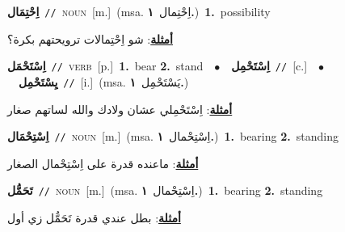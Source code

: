 \documentclass[10pt,a4paper,twoside]{article} %
\begin{document}
\begin{multicols}{2}
{\setlength\topsep{0pt}\textbf{\foreignlanguage{arabic}{اِحْتِمَال}}\ {\color{gray}\texttt{//}\color{black}}\ \textsc{noun}\ [m.]\ \color{gray}(msa. \foreignlanguage{arabic}{اِحْتِمال}~\foreignlanguage{arabic}{\textbf{١.}})\color{black}\ \textbf{1.}~possibility\  \begin{flushright}\color{gray}\foreignlanguage{arabic}{\textbf{\underline{\foreignlanguage{arabic}{أمثلة}}}: شو اِحْتِمالات ترويحتهم بكرة؟}\end{flushright}\color{black}} \vspace{2mm}

{\setlength\topsep{0pt}\textbf{\foreignlanguage{arabic}{اِسْتَحْمَل}}\ {\color{gray}\texttt{//}\color{black}}\ \textsc{verb}\ [p.]\ \textbf{1.}~bear  \textbf{2.}~stand\ \ $\bullet$\ \ \setlength\topsep{0pt}\textbf{\foreignlanguage{arabic}{اِسْتَحْمِل}}\ {\color{gray}\texttt{//}\color{black}}\ [c.]\ \ $\bullet$\ \ \setlength\topsep{0pt}\textbf{\foreignlanguage{arabic}{يِسْتَحْمِل}}\ {\color{gray}\texttt{//}\color{black}}\ [i.]\ \color{gray}(msa. \foreignlanguage{arabic}{يَسْتَحْمِل}~\foreignlanguage{arabic}{\textbf{١.}})\color{black}\  \begin{flushright}\color{gray}\foreignlanguage{arabic}{\textbf{\underline{\foreignlanguage{arabic}{أمثلة}}}: اِسْتَحْمِلي عشان ولادك والله لساتهم صغار}\end{flushright}\color{black}} \vspace{2mm}

{\setlength\topsep{0pt}\textbf{\foreignlanguage{arabic}{اِسْتِحْمَال}}\ {\color{gray}\texttt{//}\color{black}}\ \textsc{noun}\ [m.]\ \color{gray}(msa. \foreignlanguage{arabic}{اِسْتِحْمال}~\foreignlanguage{arabic}{\textbf{١.}})\color{black}\ \textbf{1.}~bearing  \textbf{2.}~standing\  \begin{flushright}\color{gray}\foreignlanguage{arabic}{\textbf{\underline{\foreignlanguage{arabic}{أمثلة}}}: ماعنده قدرة على اِسْتِحْمال الصغار}\end{flushright}\color{black}} \vspace{2mm}

{\setlength\topsep{0pt}\textbf{\foreignlanguage{arabic}{تَحَمُّل}}\ {\color{gray}\texttt{//}\color{black}}\ \textsc{noun}\ [m.]\ \color{gray}(msa. \foreignlanguage{arabic}{اِسْتِحْمال}~\foreignlanguage{arabic}{\textbf{١.}})\color{black}\ \textbf{1.}~bearing  \textbf{2.}~standing\  \begin{flushright}\color{gray}\foreignlanguage{arabic}{\textbf{\underline{\foreignlanguage{arabic}{أمثلة}}}: بطل عندي قدرة تَحَمُّل زي أول}\end{flushright}\color{black}} \vspace{2mm}


\end{multicols}
\end{document}
